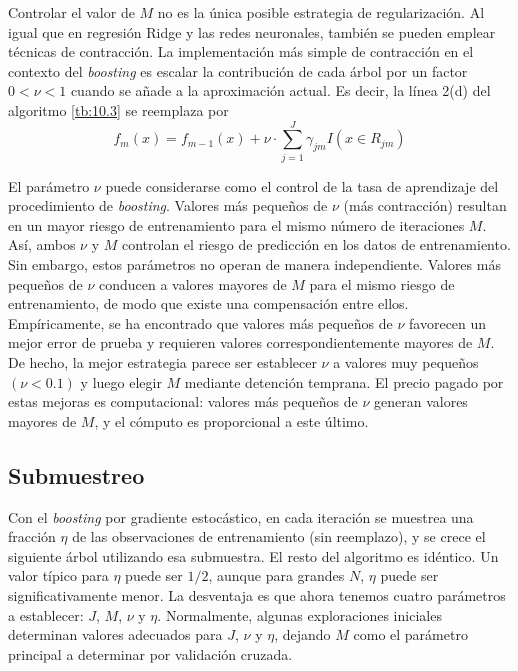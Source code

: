 Controlar el valor de $M$ no es la única posible estrategia de regularización. Al igual que en regresión Ridge y las redes neuronales, también se pueden emplear técnicas de contracción. La implementación más simple de contracción en el contexto del \textit{boosting} es escalar la contribución de cada árbol por un factor $0 < \nu < 1$ cuando se añade a la aproximación actual. Es decir, la línea 2(d) del algoritmo \ref{tb:10.3} se reemplaza por
\begin{equation}
f_m(x) = f_{m-1}(x) + \nu \cdot \sum_{j=1}^{J} \gamma_{jm} I(x \in R_{jm})
\label{eq_boost:10.41}
\end{equation}

El parámetro $\nu$ puede considerarse como el control de la tasa de aprendizaje del procedimiento de \textit{boosting}. Valores más pequeños de $\nu$ (más contracción) resultan en un mayor riesgo de entrenamiento para el mismo número de iteraciones $M$. Así, ambos $\nu$ y $M$ controlan el riesgo de predicción en los datos de entrenamiento. Sin embargo, estos parámetros no operan de manera independiente. Valores más pequeños de $\nu$ conducen a valores mayores de $M$ para el mismo riesgo de entrenamiento, de modo que existe una compensación entre ellos. \\

Empíricamente, se ha encontrado que valores más pequeños de $\nu$ favorecen un mejor error de prueba y requieren valores correspondientemente mayores de $M$. De hecho, la mejor estrategia parece ser establecer $\nu$ a valores muy pequeños $(\nu < 0.1)$ y luego elegir $M$ mediante detención temprana. El precio pagado por estas mejoras es computacional: valores más pequeños de $\nu$ generan valores mayores de $M$, y el cómputo es proporcional a este último.

\subsection{Submuestreo}

Con el \textit{boosting} por gradiente estocástico, en cada iteración se muestrea una fracción $\eta$ de las observaciones de entrenamiento (sin reemplazo), y se crece el siguiente árbol utilizando esa submuestra. El resto del algoritmo es idéntico. Un valor típico para $\eta$ puede ser $1/2$, aunque para grandes $N$, $\eta$ puede ser significativamente menor. La desventaja es que ahora tenemos cuatro parámetros a establecer: $J$, $M$, $\nu$ y $\eta$. Normalmente, algunas exploraciones iniciales determinan valores adecuados para $J$, $\nu$ y $\eta$, dejando $M$ como el parámetro principal a determinar por validación cruzada.

